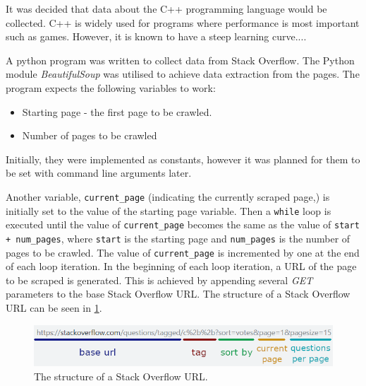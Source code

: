 \documentclass[12pt,a4paper]{article}
\newcommand{\captionstyle}[1] {
    \small{#1}
}
\begin{document}
It was decided that data about the C++ programming language would be collected. C++ is widely used for programs where performance is most important such as games. However, it is known to have a steep learning curve....

A python program was written to collect data from Stack Overflow. The Python module \textit{BeautifulSoup} was utilised to achieve data extraction from the pages. The program expects the following variables to work:
\begin{itemize}
    \item Starting page - the first page to be crawled.
    \item Number of pages to be crawled
\end{itemize}

Initially, they were implemented as constants, however it was planned for them to be set with command line arguments later.

Another variable, \texttt{current\_page} (indicating the currently scraped page,) is initially set to the value of the starting page variable. Then a \texttt{while} loop is executed until the value of \texttt{current\_page} becomes the same as the value of \texttt{start + num\_pages}, where \texttt{start} is the starting page and \texttt{num\_pages} is the number of pages to be crawled. The value of \texttt{current\_page} is incremented by one at the end of each loop iteration. In the beginning of each loop iteration, a URL of the page to be scraped is generated. This is achieved by appending several \textit{GET} parameters to the base Stack Overflow URL. The structure of a Stack Overflow URL can be seen in \cref{fig:so-url}.

\begin{figure}[!htb]%
    \centering
    \includegraphics[width=1.0\columnwidth]{so-url}%
    \caption{\captionstyle{The structure of a Stack Overflow URL.}}%
    \label{fig:so-url}%
\end{figure}
\end{document}
